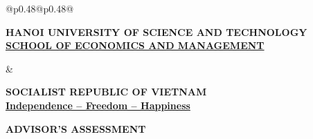 \thispagestyle{empty}
\begin{center}
    \begin{tabular}{@{}p{0.48\textwidth}@{\hspace{0.04\textwidth}}p{0.48\textwidth}@{}}
        \begin{minipage}[t]{\linewidth}
            \centering
            {\fontsize{10pt}{15.6pt}\selectfont\textbf{HANOI UNIVERSITY OF SCIENCE AND TECHNOLOGY}} \\[0.2em]
            {\fontsize{10pt}{15.6pt}\underline{\textbf{SCHOOL OF ECONOMICS AND MANAGEMENT}}}
        \end{minipage}
        &
        \begin{minipage}[t]{\linewidth}
            \centering
            {\fontsize{10pt}{15.6pt}\selectfont\textbf{SOCIALIST REPUBLIC OF VIETNAM}} \\[0.2em]
            {\fontsize{10pt}{15.6pt}\underline{\textbf{Independence -- Freedom -- Happiness}}}
        \end{minipage}
    \end{tabular}
\end{center}

\begin{center}
\textbf{\LARGE ADVISOR'S ASSESSMENT}
\end{center}

